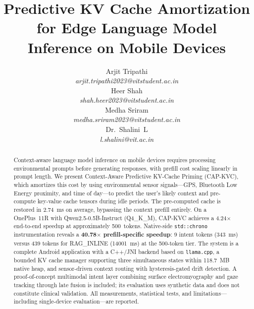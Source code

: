 \documentclass[journal]{IEEEtran}
\begin{document}
\title{Predictive KV Cache Amortization for Edge Language Model Inference on Mobile Devices}

\author{
\begin{minipage}[t]{0.45\textwidth}
\centering
Arjit Tripathi\\
\textit{arjit.tripathi2023@vitstudent.ac.in}
\end{minipage}
\hfill
\begin{minipage}[t]{0.45\textwidth}
\centering
Heer Shah\\
\textit{shah.heer2023@vitstudent.ac.in}
\end{minipage}

\vspace{1em}

\begin{minipage}[t]{0.45\textwidth}
\centering
Medha Sriram\\
\textit{medha.sriram2023@vitstudent.ac.in}
\end{minipage}
\hfill
\begin{minipage}[t]{0.45\textwidth}
\centering
Dr.~Shalini~L\\
\textit{l.shalini@vit.ac.in}
\end{minipage}
}

\maketitle

\begin{abstract}
Context-aware language model inference on mobile devices requires processing environmental prompts before generating responses, with prefill cost scaling linearly in prompt length. We present Context-Aware Predictive KV-Cache Priming (CAP-KVC), which amortizes this cost by using environmental sensor signals---GPS, Bluetooth Low Energy proximity, and time of day---to predict the user's likely context and pre-compute key-value cache tensors during idle periods. The pre-computed cache is restored in 2.74~ms on average, bypassing the context prefill entirely. On a OnePlus~11R with Qwen2.5-0.5B-Instruct (Q4\_K\_M), CAP-KVC achieves a 4.24$\times$ end-to-end speedup at approximately 500~tokens. Native-side \texttt{std::chrono} instrumentation reveals a \textbf{40.78$\times$ prefill-specific speedup}: 9 intent tokens (343~ms) versus 439 tokens for RAG\_INLINE (14001~ms) at the 500-token tier. The system is a complete Android application with a C++/JNI backend based on \texttt{llama.cpp}, a bounded KV cache manager supporting three simultaneous states within 118.7~MB native heap, and sensor-driven context routing with hysteresis-gated drift detection. A proof-of-concept multimodal intent layer combining surface electromyography and gaze tracking through late fusion is included; its evaluation uses synthetic data and does not constitute clinical validation. All measurements, statistical tests, and limitations---including single-device evaluation---are reported.
\end{abstract}
\end{document}

